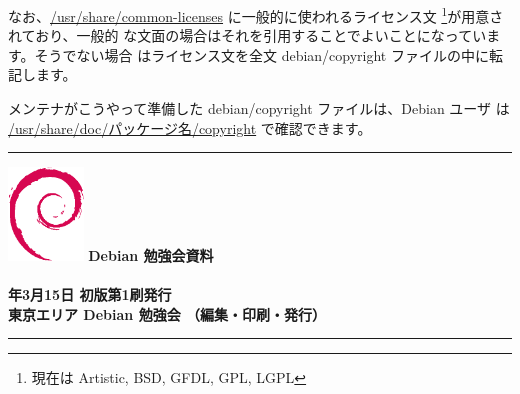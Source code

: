 \documentclass[mingoth,a4paper]{jsarticle}
\newcommand{\debmtgyear}{2008}
\newcommand{\debmtgmonth}{3}
\newcommand{\debmtgdate}{15}
\begin{document}
なお、\url{/usr/share/common-licenses} に一般的に使われるライセンス文
\footnote{現在は Artistic, BSD, GFDL, GPL, LGPL}が用意されており、一般的
な文面の場合はそれを引用することでよいことになっています。そうでない場合
はライセンス文を全文 debian/copyright ファイルの中に転記します。

メンテナがこうやって準備した debian/copyright ファイルは、Debian ユーザ
は \url{/usr/share/doc/パッケージ名/copyright} で確認できます。

\clearpage


\cleartooddpage

\vspace*{15cm}
\hrule
\vspace{2mm}
\includegraphics[width=2cm]{image200502/openlogo-nd.eps}
\noindent \Large \bf Debian 勉強会資料\\ \\
\noindent \normalfont \debmtgyear{}年\debmtgmonth{}月\debmtgdate{}日 \hspace{5mm}  初版第1刷発行\\
\noindent \normalfont 東京エリア Debian 勉強会 （編集・印刷・発行）\\
\hrule
\end{document}
